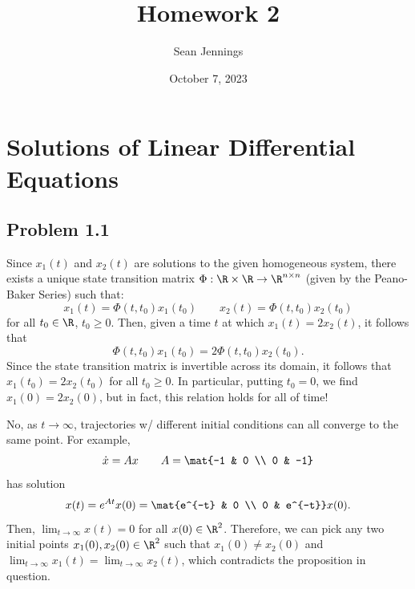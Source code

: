 \documentclass{homework}
\title{Homework 2}
\author{Sean Jennings}
\date{October 7, 2023}
\begin{document}
\maketitle

\section{Solutions of Linear Differential Equations}
\subsection{Problem 1.1}
\begin{letterenum}
    \item Since $x_1(t)$ and $x_2(t)$ are solutions to the given homogeneous system,
        there exists a unique state transition matrix $\Phi: \R \times \R \to \R^{n \times n}$
        (given by the Peano-Baker Series) such that:
        \begin{equation}
            x_1(t) = \Phi(t, t_0) x_1(t_0) \qquad x_2(t) = \Phi(t, t_0) x_2(t_0)
        \end{equation}
        for all $t_0 \in \R$, $t_0 \geq 0$. Then, given a time $t$ at which $x_1(t) = 2x_2(t)$, it follows that
        \begin{equation}
            \Phi(t, t_0)x_1(t_0) = 2 \Phi(t, t_0)x_2(t_0).
        \end{equation}
        Since the state transition matrix is invertible across its domain,
        it follows that $x_1(t_0) = 2x_2(t_0)$ for all $t_0\geq0$. In particular,
        putting $t_0 = 0$, we find $x_1(0) = 2x_2(0)$,
        but in fact, this relation holds for all of time!

    \item No, as $t\to\infty$, trajectories w/ different initial conditions can all converge
    to the same point. For example,
    \begin{equation}
        \dot{x} = A x \qquad A = \mat{-1 & 0 \\ 0 & -1}
    \end{equation}
    has solution
    \begin{equation}
        x(t) = e^{At}x(0) = \mat{e^{-t} & 0 \\ 0 & e^{-t}} x(0).
    \end{equation}
    Then, $\lim_{t\to\infty}x(t) = 0$ for all $x(0) \in \R^2$. Therefore, we can pick
    any two initial points $x_1(0),x_2(0)\in\R^2$ such that $x_1(0) \neq x_2(0)$
    and $\lim_{t\to\infty}x_1(t) = \lim_{t\to\infty}x_2(t)$, which contradicts
    the proposition in question.
\end{letterenum}
\end{document}
